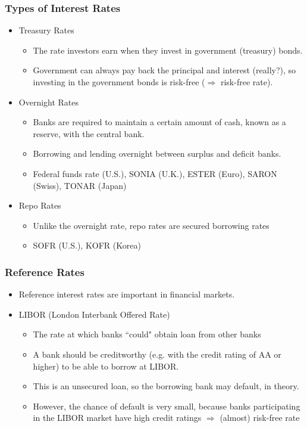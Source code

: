 \documentclass[10pt]{beamer}
\begin{document}
\begin{frame}
	\frametitle{Types of Interest Rates}
	\begin{itemize} \itemsep10pt
		\item Treasury Rates \vspace{5pt}
		\begin{itemize}\itemsep5pt
			\item The rate investors earn when they invest in government (treasury) bonds.
			\item Government can always pay back the principal and interest (really?), so investing in the government bonds is risk-free ($\Rightarrow$ risk-free rate).			
		\end{itemize}
		\item Overnight Rates \vspace{5pt}
		\begin{itemize}\itemsep5pt
			\item Banks are required to maintain a certain amount of cash, known as a reserve, with the
			central bank.
			\item Borrowing and lending overnight between surplus and deficit banks.
			\item Federal funds rate (U.S.), SONIA (U.K.), ESTER (Euro), SARON (Swiss), TONAR (Japan)
		\end{itemize}

		\item Repo Rates \vspace{5pt}
		\begin{itemize}\itemsep5pt
			\item Unlike the overnight rate, repo rates are secured borrowing rates
			\item SOFR (U.S.), KOFR (Korea)
		\end{itemize}
		
	\end{itemize}
\end{frame}


\begin{frame}
	\frametitle{Reference Rates}
	\begin{itemize} \itemsep10pt
		\item Reference interest rates are important in financial markets.
		
		\item LIBOR (London Interbank Offered Rate)\vspace{5pt}
		\begin{itemize}\itemsep5pt
			\item The rate at which banks ``could" obtain loan from other banks
			\item A bank should be creditworthy (e.g. with the credit rating of AA or higher) to be able to borrow at LIBOR.
			\item This is an unsecured loan, so the borrowing bank may default, in theory.
			\item However, the chance of default is very small, because banks participating in the LIBOR market have high credit ratings $\Rightarrow$ (almost) risk-free rate
		\end{itemize}
	\end{itemize}
\end{frame}
\end{document}
